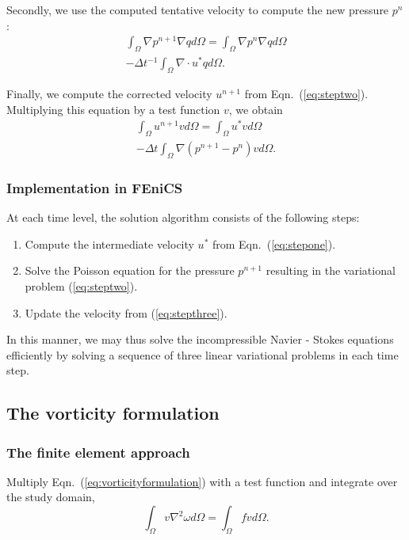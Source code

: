 \documentclass[12pt]{article}
\numberwithin{figure}{section}  %
\numberwithin{equation}{section}  %
\begin{document}
\begin{multicols}{2}
Secondly, we use the computed tentative velocity to compute the new pressure $p^n$:
\begin{multline}\label{eq:steptwo}
	\int_\Omega\nabla{p}^{n+1}\nabla{q}d\Omega = \int_\Omega\nabla{p}^n\nabla{q}d\Omega \\
	- \Delta{t}^{-1}\int_\Omega\nabla\cdot{u}^*qd\Omega.
\end{multline}

Finally, we compute the corrected velocity $u^{n+1}$ from Eqn.\ (\ref{eq:steptwo}). Multiplying this equation by a test function $v$, we obtain
\begin{multline}\label{eq:stepthree}
	\int_\Omega{u}^{n+1}vd\Omega = \int_\Omega{u}^*vd\Omega \\
	- \Delta{t}\int_\Omega\nabla(p^{n+1}-p^n)vd\Omega.
\end{multline}

\subsubsection{Implementation in FEniCS}

At each time level, the solution algorithm consists of the following steps:
\begin{enumerate}
	\item{Compute the intermediate velocity $u^*$ from Eqn.\ (\ref{eq:stepone}).}
	\item{Solve the Poisson equation for the pressure $p^{n+1}$ resulting in the variational problem (\ref{eq:steptwo}).}
	\item{Update the velocity from (\ref{eq:stepthree}).}
\end{enumerate}

In this manner, we may thus solve the incompressible Navier - Stokes equations efficiently by solving a sequence of three linear variational problems in each time step.

\subsection{The vorticity formulation}

\subsubsection{The finite element approach}

Multiply Eqn.\ (\ref{eq:vorticityformulation}) with a test function and integrate over the study domain,
\begin{equation}
    \int_\Omega{v}\nabla^2\omega{d}\Omega = \int_\Omega{f}vd\Omega.
\end{equation}


\end{multicols}
\end{document}
